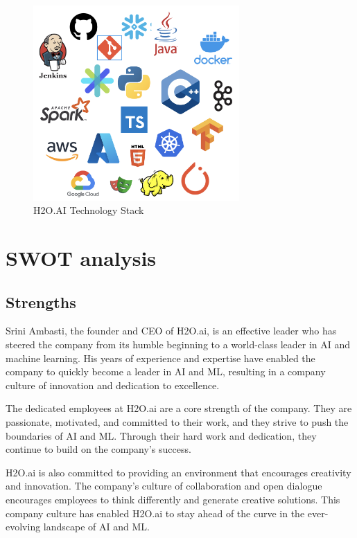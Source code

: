 \documentclass[12pt,a4paper]{report}
\begin{document}
\begin{figure}[H]
\centering
\includegraphics[width=0.7\textwidth]{techstack.png}
\caption{H2O.AI Technology Stack}
\end{figure}

\clearpage

\section{SWOT analysis}


\subsection{Strengths}
Srini Ambasti, the founder and CEO of H2O.ai, is an effective leader who has steered the company from its humble beginning to a world-class leader in \ac{AI} and machine learning. His years of experience and expertise have enabled the company to quickly become a leader in AI and ML, resulting in a company culture of innovation and dedication to excellence.

The dedicated employees at H2O.ai are a core strength of the company. They are passionate, motivated, and committed to their work, and they strive to push the boundaries of AI and ML. Through their hard work and dedication, they continue to build on the company's success.

H2O.ai is also committed to providing an environment that encourages creativity and innovation. The company's culture of collaboration and open dialogue encourages employees to think differently and generate creative solutions. This company culture has enabled H2O.ai to stay ahead of the curve in the ever-evolving landscape of AI and ML.
\end{document}
